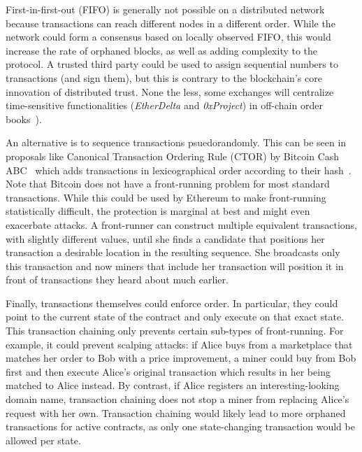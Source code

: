 First-in-first-out (FIFO) is generally not possible on a distributed network because transactions can reach different nodes in a different order. While the network could form a consensus based on locally observed FIFO, this would increase the rate of orphaned blocks, as well as adding complexity to the protocol. A trusted third party could be used to assign sequential numbers to transactions (and sign them), but this is contrary to the blockchain's core innovation of distributed trust. None the less, some exchanges will centralize time-sensitive functionalities (\eg  \textit{EtherDelta} and \textit{0xProject}) in off-chain order books~\cite{warren20170x,0xfrontrunning:online}).

An alternative is to sequence transactions psuedorandomly. This can be seen in proposals like Canonical Transaction Ordering Rule (CTOR) by Bitcoin Cash ABC~\cite{bitcoincashabcFork} which adds transactions in lexicographical order according to their hash~\cite{bitcoinABC2018CTOR}. Note that Bitcoin does not have a front-running problem for most standard transactions. While this could be used by Ethereum to make front-running statistically difficult, the protection is marginal at best and might even exacerbate attacks. A front-runner can construct multiple equivalent transactions, with slightly different values, until she finds a candidate that positions her transaction a desirable location in the resulting sequence. She broadcasts only this transaction and now miners that include her transaction will position it in front of transactions they heard about much earlier. 


Finally, transactions themselves could enforce order. In particular, they could point to the current state of the contract and only execute on that exact state. This transaction chaining only prevents certain sub-types of front-running. For example, it could prevent scalping attacks: if Alice buys from a marketplace that matches her order to Bob with a price improvement, a miner could buy from Bob first and then execute Alice's original transaction which results in her being matched to Alice instead. By contrast, if Alice registers an interesting-looking domain name, transaction chaining does not stop a miner from replacing Alice's request with her own. Transaction chaining would likely lead to more orphaned transactions for active contracts, as only one state-changing transaction would be allowed per state.


